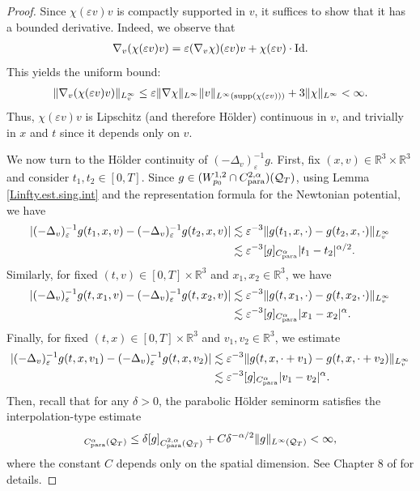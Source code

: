 \documentclass[reqno,11pt,final]{amsart}
\theoremstyle{plain}
\numberwithin{equation}{section}
\numberwithin{theorem}{section}
\begin{document}
\begin{proof}
Since $\chi(\varepsilon v)v$ is compactly supported in $v$, it suffices to show that it has a bounded derivative. Indeed, we observe that
\begin{align*}
\nabla_v(\chi(\varepsilon v)v) = \varepsilon(\nabla_v\chi)(\varepsilon v)v + \chi(\varepsilon v) \cdot \textup{Id}.
\end{align*}This yields the uniform bound:
\begin{align*}
\lVert \nabla_v(\chi(\varepsilon v)v)\rVert_{L^\infty_v} \le \varepsilon \lVert \nabla\chi\rVert_{L^\infty} \lVert v\rVert_{L^\infty(\textup{supp}(\chi(\varepsilon v)))} + 3\lVert \chi\rVert_{L^\infty} <\infty.
\end{align*}Thus, $\chi(\varepsilon v)v$ is Lipschitz (and therefore H\"older) continuous in $v$, and trivially in $x$ and $t$ since it depends only on $v$.

We now turn to the H\"older continuity of $(-\Delta_v)_\varepsilon^{-1}g$. First, fix $(x,v)\in\mathbb{R}^3\times\mathbb{R}^3$ and consider $t_1,t_2\in [0, T]$. Since $g\in (W_{p_0}^{1,2}\cap C_\textup{para}^{2,\alpha})(\mathcal{Q}_T)$, using Lemma \ref{Linfty.est.sing.int} and the representation formula for the Newtonian potential, we have
\begin{align*}
|(-\Delta_v)_\varepsilon^{-1}g(t_1,x,v) - (-\Delta_v)_\varepsilon^{-1}g(t_2,x,v)| &\lesssim \varepsilon^{-3}\lVert g(t_1,x,\cdot) - g(t_2,x,\cdot)\rVert_{L^\infty_v}\\
&\lesssim \varepsilon^{-3}[g]_{C_\textup{para}^{\alpha}}|t_1 - t_2|^{\alpha/2}.
\end{align*}Similarly, for fixed $(t,v)\in[0,T]\times\mathbb{R}^3$ and $x_1, x_2\in \mathbb{R}^3$, we have
\begin{align*}
|(-\Delta_v)_\varepsilon^{-1}g(t,x_1,v) - (-\Delta_v)_\varepsilon^{-1}g(t,x_2,v)| & \lesssim \varepsilon^{-3}\lVert g(t,x_1,\cdot) - g(t,x_2,\cdot)\rVert_{L^\infty_v}\\
&\lesssim  \varepsilon^{-3}[g]_{C_\textup{para}^{\alpha}} |x_1 - x_2|^\alpha.
\end{align*}Finally, for fixed $(t,x)\in[0,T]\times\mathbb{R}^3$ and $v_1, v_2\in\mathbb{R}^3$, we estimate
\begin{align*}
|(-\Delta_v)_\varepsilon^{-1}g(t,x,v_1) - (-\Delta_v)_\varepsilon^{-1}g(t,x,v_2)| &\lesssim \varepsilon^{-3}\lVert g(t,x,\cdot+v_1) - g(t,x,\cdot+v_2)\rVert_{L^\infty_v}\\
&\lesssim \varepsilon^{-3}[g]_{C_\textup{para}^{\alpha}}|v_1 - v_2|^\alpha.
\end{align*}Then, recall that for any $\delta>0$, the parabolic H\"older seminorm satisfies the interpolation-type estimate
\begin{align*}
[g]_{C_\textup{para}^\alpha(\mathcal{Q}_T)} \le \delta [g]_{C_\textup{para}^{2,\alpha}(\mathcal{Q}_T)} + C\delta^{-\alpha/2}\lVert g\rVert_{L^\infty(\mathcal{Q}_T)}<\infty,
\end{align*}where the constant $C$ depends only on the spatial dimension. See Chapter 8 of \cite{Ell_Krylov_1996} for details.
\end{proof}
\end{document}
